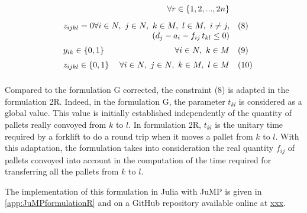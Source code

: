 \documentclass[preprint,12pt,authoryear]{elsarticle}
\begin{document}
\begin{equation*}
\begin{array}{ll@{}ll}
                    &  \hfill  \forall r \in \{1,2,...,2n\}&  \vspace{3mm}\\ 
                    & z_{ijkl} = 0   \hfill  \forall i\in N, \ j \in N, \ k \in M, \ l \in M, \  i \neq j, & \quad (8)\\
                    &   \hfill   (d_j - a_i - f_{ij} \, t_{kl} \leq 0) &  \vspace{2mm}\\
                    & y_{ik} \in \{0,1\}   \hfill  \forall i\in N, \ k \in M & \quad  (9) \vspace{2mm}\\
                    & z_{ijkl} \in \{0,1\}   \hfill   \forall i\in N, \ j \in N, \ k \in M, \ l \in M & \quad  (10) 
                    \vspace{2mm}\\
    \end{array}
\end{equation*}

Compared to the formulation G corrected, the constraint (8) is adapted in the formulation 2R.
%
Indeed, in the formulation G, the parameter $t_{kl}$ is considered as a global value. This value is initially established independently of the quantity of pallets really convoyed from $k$ to $l$.
%
In formulation 2R, $t_{kl}$ is the unitary time required by a forklift to do a round trip when it moves a pallet from $k$ to $l$.
With this adaptation, the formulation takes into consideration the real quantity $f_{ij}$ of pallets convoyed into account in the computation of the time required for transferring all the pallets from $k$ to $l$.

The implementation of this formulation in Julia with JuMP is given in \ref{app:JuMPformulationR} and on a GitHub repository available online at \url{xxx}.
\medskip

%
\end{document}
